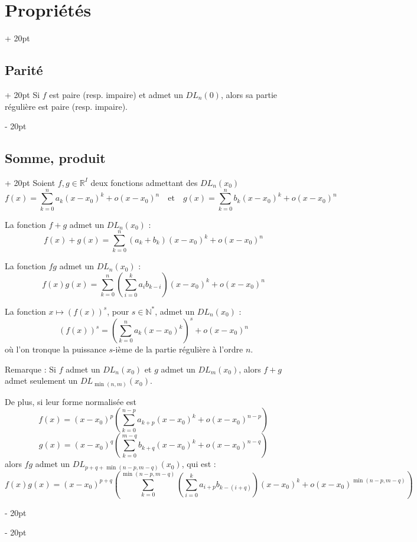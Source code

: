 \documentclass[a4paper, 12pt, twoside]{article}
\newcommand{\N}{\mathbb{N}} %
\newcommand{\R}{\mathbb{R}} %
\newcommand{\lr}[1]{\left( #1 \right)}
\newcommand{\ind}[1][20pt]{\advance\leftskip + #1}
\newcommand{\deind}[1][20pt]{\advance\leftskip - #1}
\newenvironment{indt}[2][20pt]{#2 \par \ind[#1]}{\par \deind} %
\begin{document}
\begin{indt}{\section{Propriétés}}
        \vspace{12pt}
        
        \begin{indt}{\subsection{Parité}}
            Si $f$ est paire (resp. impaire) et admet un $DL_n(0)$, alors sa partie régulière est paire (resp. impaire).
        \end{indt}
        
        \vspace{12pt}
        
        \begin{indt}{\subsection{Somme, produit}}
            Soient $f, g \in \R^I$ deux fonctions admettant des $DL_n(x_0)$
                \[
                    f(x) = \sum_{k = 0}^n a_k (x - x_0)^k + o(x - x_0)^n
                    \quad \text{et} \quad
                    g(x) = \sum_{k = 0}^n b_k (x - x_0)^k + o(x - x_0)^n
                \]
            
            La fonction $f + g$ admet un $DL_n(x_0)$ :
                \[ f(x) + g(x) = \sum_{k = 0}^n (a_k + b_k) (x - x_0)^k + o(x - x_0)^n \]
            
            La fonction $fg$ admet un $DL_n(x_0)$ :
                \[ f(x)g(x) = \sum_{k = 0}^n \lr{\sum_{i = 0}^k a_i b_{k - i}} (x - x_0)^k + o(x - x_0)^n \]
            
            La fonction $x \longmapsto (f(x))^s$, pour $s \in \N^*$, admet un $DL_n(x_0)$ :
                \[ (f(x))^s = \lr{\sum_{k = 0}^n a_k (x - x_0)^k}^s + o(x - x_0)^n \]
            où l'on tronque la puissance $s$-ième de la partie régulière à l'ordre $n$.
            
            \vspace{12pt}
            
            Remarque : Si $f$ admet un $DL_n(x_0)$ et $g$ admet un $DL_m(x_0)$, alors $f + g$ admet seulement un $DL_{\min(n, m)}(x_0)$.
            
            De plus, si leur forme normalisée est
                \[ f(x) = (x - x_0)^p \left( \sum_{k = 0}^{n - p} a_{k + p} (x - x_0)^k + o(x - x_0)^{n - p} \right) \]
                \[ g(x) = (x - x_0)^q \left( \sum_{k = 0}^{m - q} b_{k + q} (x - x_0)^k + o(x - x_0)^{n - q} \right) \]
            alors $fg$ admet un $DL_{p + q + \min(n-p, m-q)}(x_0)$, qui est :
                \[ f(x)g(x) = (x - x_0)^{p + q} \lr{ \sum_{k = 0}^{\min(n - p, m - q)} \lr{ \sum_{i = 0}^k a_{i + p} b_{k - (i + q)} }(x - x_0)^k + o(x - x_0)^{\min(n-p, m-q)} } \]
        \end{indt}
        

\end{indt}
\end{document}
